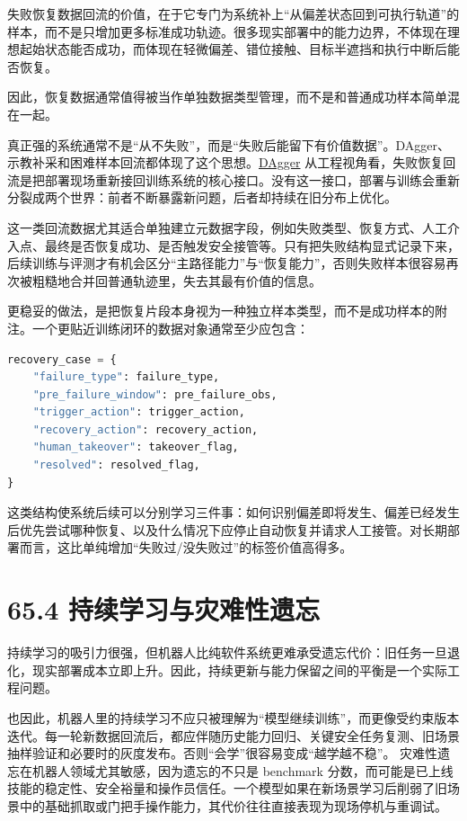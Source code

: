 失败恢复数据回流的价值，在于它专门为系统补上“从偏差状态回到可执行轨道”的样本，而不是只增加更多标准成功轨迹。很多现实部署中的能力边界，不体现在理想起始状态能否成功，而体现在轻微偏差、错位接触、目标半遮挡和执行中断后能否恢复。

因此，恢复数据通常值得被当作单独数据类型管理，而不是和普通成功样本简单混在一起。

真正强的系统通常不是“从不失败”，而是“失败后能留下有价值数据”。DAgger、示教补采和困难样本回流都体现了这个思想。\href{https://proceedings.mlr.press/v15/ross11a.html}{DAgger} 从工程视角看，失败恢复回流是把部署现场重新接回训练系统的核心接口。没有这一接口，部署与训练会重新分裂成两个世界：前者不断暴露新问题，后者却持续在旧分布上优化。

这一类回流数据尤其适合单独建立元数据字段，例如失败类型、恢复方式、人工介入点、最终是否恢复成功、是否触发安全接管等。只有把失败结构显式记录下来，后续训练与评测才有机会区分“主路径能力”与“恢复能力”，否则失败样本很容易再次被粗糙地合并回普通轨迹里，失去其最有价值的信息。

更稳妥的做法，是把恢复片段本身视为一种独立样本类型，而不是成功样本的附注。一个更贴近训练闭环的数据对象通常至少应包含：

\begin{lstlisting}[language=python]
recovery_case = {
    "failure_type": failure_type,
    "pre_failure_window": pre_failure_obs,
    "trigger_action": trigger_action,
    "recovery_action": recovery_action,
    "human_takeover": takeover_flag,
    "resolved": resolved_flag,
}
\end{lstlisting}

这类结构使系统后续可以分别学习三件事：如何识别偏差即将发生、偏差已经发生后优先尝试哪种恢复、以及什么情况下应停止自动恢复并请求人工接管。对长期部署而言，这比单纯增加“失败过/没失败过”的标签价值高得多。

\section*{65.4 持续学习与灾难性遗忘}


持续学习的吸引力很强，但机器人比纯软件系统更难承受遗忘代价：旧任务一旦退化，现实部署成本立即上升。因此，持续更新与能力保留之间的平衡是一个实际工程问题。

也因此，机器人里的持续学习不应只被理解为“模型继续训练”，而更像受约束版本迭代。每一轮新数据回流后，都应伴随历史能力回归、关键安全任务复测、旧场景抽样验证和必要时的灰度发布。否则“会学”很容易变成“越学越不稳”。 灾难性遗忘在机器人领域尤其敏感，因为遗忘的不只是 benchmark 分数，而可能是已上线技能的稳定性、安全裕量和操作员信任。一个模型如果在新场景学习后削弱了旧场景中的基础抓取或门把手操作能力，其代价往往直接表现为现场停机与重调试。

